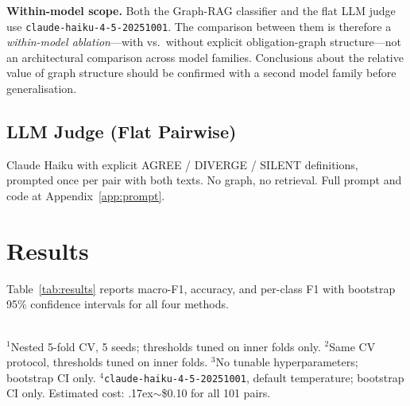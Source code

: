 \documentclass[manuscript]{acmart}
\begin{document}
\textbf{Within-model scope.} Both the Graph-RAG classifier and the flat LLM
judge use \texttt{claude-haiku-4-5-20251001}. The comparison between them is
therefore a \textit{within-model ablation}---with vs.\ without explicit
obligation-graph structure---not an architectural comparison across model
families. Conclusions about the relative value of graph structure should be
confirmed with a second model family before generalisation.

\subsection{LLM Judge (Flat Pairwise)}

Claude Haiku with explicit AGREE / DIVERGE / SILENT definitions, prompted once
per pair with both texts. No graph, no retrieval. Full prompt and code at
Appendix~\ref{app:prompt}.

\section{Results}
\label{sec:results}

Table~\ref{tab:results} reports macro-F1, accuracy, and per-class F1 with
bootstrap 95\% confidence intervals for all four methods.

\begin{table}
  \caption{Macro-F1, accuracy, and per-class F1 with bootstrap 95\% confidence
    intervals for the four baselines ($n = 101$ pairs).}
  \label{tab:results}
  \smallskip\\
  {\small $^1$Nested 5-fold CV, 5 seeds; thresholds tuned on inner folds only.
  $^2$Same CV protocol, thresholds tuned on inner folds.
  $^3$No tunable hyperparameters; bootstrap CI only.
  $^4$\texttt{claude-haiku-4-5-20251001}, default temperature; bootstrap CI
  only. Estimated cost: {\raise.17ex\hbox{$\scriptstyle\sim$}}\$0.10 for all
  101 pairs.}
\end{table}
\end{document}
